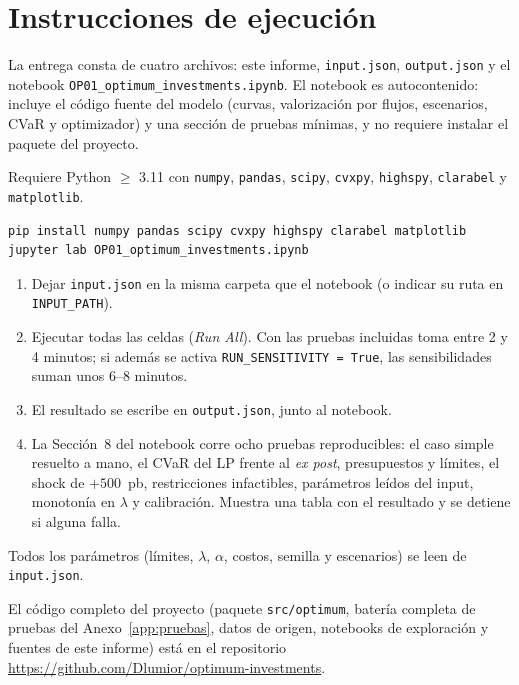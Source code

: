 \section{Instrucciones de ejecución}\label{app:instrucciones}
\newcommand{\repourl}{https://github.com/Dlumior/optimum-investments}
La entrega consta de cuatro archivos: este informe, \texttt{input.json}, \texttt{output.json} y el notebook
\texttt{OP01\_\allowbreak optimum\_\allowbreak investments.ipynb}. El notebook es autocontenido: incluye el código fuente
del modelo (curvas, valorización por flujos, escenarios, CVaR y optimizador) y una sección de pruebas mínimas, y no
requiere instalar el paquete del proyecto.

Requiere Python $\ge$ 3.11 con \texttt{numpy}, \texttt{pandas}, \texttt{scipy}, \texttt{cvxpy}, \texttt{highspy},
\texttt{clarabel} y \texttt{matplotlib}.
\begin{lstlisting}[language=bash]
pip install numpy pandas scipy cvxpy highspy clarabel matplotlib
jupyter lab OP01_optimum_investments.ipynb
\end{lstlisting}
\begin{enumerate}
  \item Dejar \texttt{input.json} en la misma carpeta que el notebook (o indicar su ruta en \texttt{INPUT\_PATH}).
  \item Ejecutar todas las celdas (\emph{Run All}). Con las pruebas incluidas toma entre 2 y 4 minutos; si
        además se activa \texttt{RUN\_SENSITIVITY = True}, las sensibilidades suman unos 6--8 minutos.
  \item El resultado se escribe en \texttt{output.json}, junto al notebook.
  \item La Sección~8 del notebook corre ocho pruebas reproducibles: el caso simple resuelto a mano, el CVaR del LP
        frente al \emph{ex post}, presupuestos y límites, el shock de $+500$~pb, restricciones infactibles,
        parámetros leídos del input, monotonía en $\lambda$ y calibración. Muestra una tabla con el resultado y
        se detiene si alguna falla.
\end{enumerate}
Todos los parámetros (límites, $\lambda$, $\alpha$, costos, semilla y escenarios) se leen de \texttt{input.json}.

El código completo del proyecto (paquete \texttt{src/optimum}, batería completa de pruebas del Anexo~\ref{app:pruebas},
datos de origen, notebooks de exploración y fuentes de este informe) está en el repositorio \url{\repourl}.
